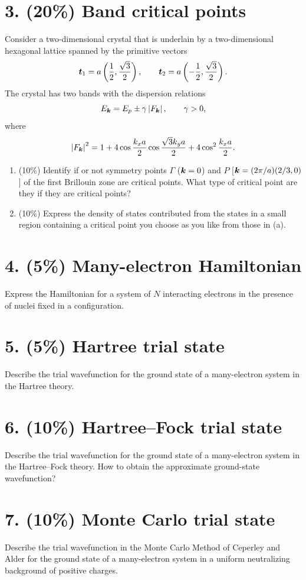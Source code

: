 \section*{3. (20\%) Band critical points}
Consider a two-dimensional crystal that is underlain by a two-dimensional hexagonal lattice spanned by the primitive vectors
\[
\boldsymbol{t}_1=a\left(\frac12,\frac{\sqrt3}{2}\right),\qquad
\boldsymbol{t}_2=a\left(-\frac12,\frac{\sqrt3}{2}\right).
\]
The crystal has two bands with the dispersion relations
\[
E_{\boldsymbol{k}}=E_p\pm\gamma\left|F_{\boldsymbol{k}}\right|,\qquad \gamma>0,
\]
where
\[
\left|F_{\boldsymbol{k}}\right|^{2}
=1+4\cos\frac{k_xa}{2}\cos\frac{\sqrt3 k_ya}{2}
+4\cos^2\frac{k_xa}{2}.
\]
\begin{enumerate}[label=(\alph*)]
\item (10\%) Identify if or not symmetry points $\Gamma$ ($\boldsymbol{k}=0$) and $P$ [$\boldsymbol{k}=(2\pi/a)(2/3,0)$] of the first Brillouin zone are critical points. What type of critical point are they if they are critical points?
\item (10\%) Express the density of states contributed from the states in a small region containing a critical point you choose as you like from those in (a).
\end{enumerate}

\section*{4. (5\%) Many-electron Hamiltonian}
Express the Hamiltonian for a system of $N$ interacting electrons in the presence of nuclei fixed in a configuration.

\section*{5. (5\%) Hartree trial state}
Describe the trial wavefunction for the ground state of a many-electron system in the Hartree theory.

\section*{6. (10\%) Hartree--Fock trial state}
Describe the trial wavefunction for the ground state of a many-electron system in the Hartree--Fock theory. How to obtain the approximate ground-state wavefunction?

\section*{7. (10\%) Monte Carlo trial state}
Describe the trial wavefunction in the Monte Carlo Method of Ceperley and Alder for the ground state of a many-electron system in a uniform neutralizing background of positive charges.

